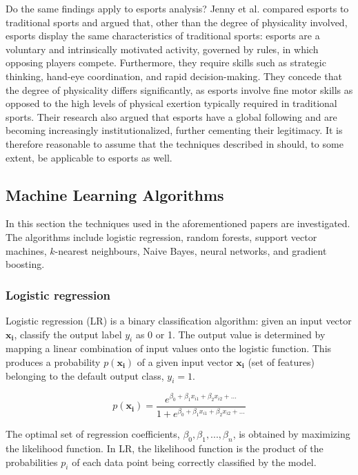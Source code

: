 Do the same findings apply to esports analysis? Jenny et al. \cite{def-esports} compared esports to traditional sports and argued that, other than the degree of physicality involved, esports display the same characteristics of traditional sports: esports are a voluntary and intrinsically motivated activity, governed by rules, in which opposing players compete. Furthermore, they require skills such as strategic thinking, hand-eye coordination, and rapid decision-making. They concede that the degree of physicality differs significantly, as esports involve fine motor skills as opposed to the high levels of physical exertion typically required in traditional sports. Their research also argued that esports have a global following and are becoming increasingly institutionalized, further cementing their legitimacy. It is therefore reasonable to assume that the techniques described in \cite{mlsports} should, to some extent, be applicable to esports as well. 

\subsection{Machine Learning Algorithms}

In this section the techniques used in the aforementioned papers are investigated. The algorithms include logistic regression, random forests, support vector machines, $k$-nearest neighbours, Naive Bayes, neural networks, and gradient boosting.

\subsubsection{Logistic regression}

Logistic regression (LR) \cite{logreg} is a binary classification algorithm: given an input vector $\bm{x_i}$, classify the output label $y_i$ as 0 or 1. The output value is determined by mapping a linear combination of input values onto the logistic function. This produces a probability $p(\bm{x_i})$ of a given input vector $\bm{x_i}$ (set of features) belonging to the default output class, $y_i = 1$. 

\begin{equation}
p(\bm{x_i}) = \frac{e^{\beta_0 + \beta_1x_{i1} + \beta_2x_{i2} + \ldots}}{1 + e^{\beta_0 + \beta_1x_{i1} + \beta_2x_{i2} + \ldots}} 
\end{equation}

The optimal set of regression coefficients, ${\beta_0, \beta_1, ..., \beta_n}$, is obtained by maximizing the likelihood function. In LR, the likelihood function is the product of the probabilities $p_i$ of each data point being correctly classified by the model. 

